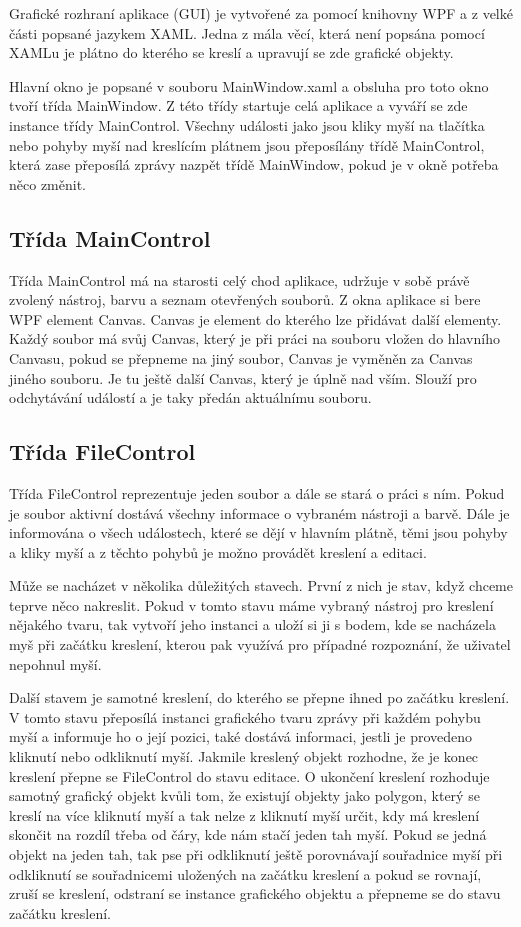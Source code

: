 \documentclass[
  field=inf,
  biblatex,
  glossaries,
  index
]{kidiplom}
\begin{document}
Grafické rozhraní aplikace (GUI) je vytvořené za pomocí knihovny WPF a z velké části popsané jazykem XAML. Jedna z mála věcí, která není popsána pomocí XAMLu je plátno do kterého se kreslí a upravují se zde grafické objekty.

Hlavní okno je popsané v souboru MainWindow.xaml a obsluha pro toto okno tvoří třída MainWindow. Z této třídy startuje celá aplikace a vyváří se zde instance třídy MainControl. Všechny události jako jsou kliky myší na tlačítka nebo pohyby myší nad kreslícím plátnem jsou přeposílány třídě MainControl, která zase přeposílá zprávy nazpět třídě MainWindow, pokud je v okně potřeba něco změnit.

\subsection{Třída MainControl}

Třída MainControl má na starosti celý chod aplikace, udržuje v sobě právě zvolený nástroj, barvu a seznam otevřených souborů. Z okna aplikace si bere WPF element Canvas. Canvas je element do kterého lze přidávat další elementy. Každý soubor má svůj  Canvas, který je při práci na souboru vložen do hlavního Canvasu, pokud se přepneme na jiný soubor, Canvas je vyměněn za Canvas jiného souboru. Je tu ještě další Canvas, který je úplně nad vším. Slouží pro odchytávání událostí a je taky předán aktuálnímu souboru.

\subsection{Třída FileControl}

Třída FileControl reprezentuje jeden soubor a dále se stará o práci s ním. Pokud je soubor aktivní dostává všechny informace o vybraném nástroji a barvě. Dále je informována o všech událostech, které se dějí v hlavním plátně, těmi jsou pohyby a kliky myší a z těchto pohybů je možno provádět kreslení a editaci.

Může se nacházet v několika důležitých stavech. První z nich je stav, když chceme teprve něco nakreslit. Pokud v tomto stavu máme vybraný nástroj pro kreslení nějakého tvaru, tak vytvoří jeho instanci a uloží si ji s bodem, kde se nacházela myš při začátku kreslení, kterou pak využívá pro případné rozpoznání, že uživatel nepohnul myší. 

Další stavem je samotné kreslení, do kterého se přepne ihned po začátku kreslení. V tomto stavu přeposílá instanci grafického tvaru zprávy při každém pohybu myší a informuje ho o její pozici, také dostává informaci, jestli je provedeno kliknutí nebo odkliknutí myší. Jakmile kreslený objekt rozhodne, že je konec kreslení přepne se FileControl do stavu editace. O ukončení kreslení rozhoduje samotný grafický objekt kvůli tom, že existují objekty jako polygon, který se kreslí na více kliknutí myší a tak nelze z kliknutí myší určit, kdy má kreslení skončit na rozdíl třeba od čáry, kde nám stačí jeden tah myší. Pokud se jedná objekt na jeden tah, tak pse při odkliknutí ještě porovnávají souřadnice myší při odkliknutí se souřadnicemi uložených na začátku kreslení a pokud se rovnají, zruší se kreslení, odstraní se instance grafického objektu a přepneme se do stavu začátku kreslení.
\end{document}
